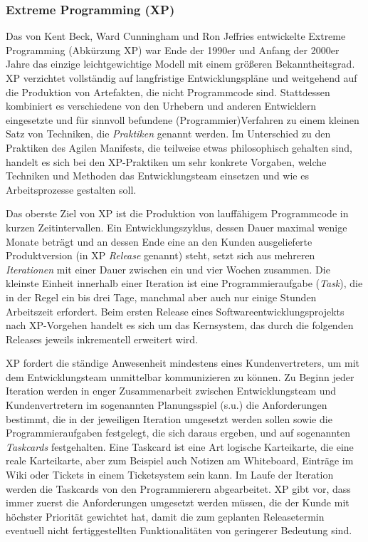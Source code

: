 \subsubsection{Extreme Programming (XP)}
\label{sec:Kap-2.2.3.1}


Das von Kent  Beck, Ward Cunningham und Ron Jeffries entwickelte Extreme Programming (Abkürzung XP) war Ende der 1990er und Anfang der 2000er Jahre das einzige leichtgewichtige Modell mit einem größeren Bekanntheitsgrad. XP verzichtet vollständig auf langfristige Entwicklungspläne und weitgehend auf die Produktion von Artefakten, die nicht Programmcode sind. Stattdessen kombiniert es verschiedene von den Urhebern und anderen Entwicklern eingesetzte und für sinnvoll befundene (Programmier)Verfahren zu einem kleinen Satz von Techniken, die 
\textit{Praktiken} genannt werden. Im Unterschied zu den Praktiken des Agilen Manifests, die teilweise etwas philosophisch gehalten sind, handelt es sich bei den XP-Praktiken um sehr konkrete Vorgaben, welche Techniken und Methoden das Entwicklungsteam einsetzen und wie es Arbeitsprozesse gestalten soll. 


Das oberste Ziel von XP ist die Produktion von lauffähigem Programmcode in kurzen Zeitintervallen. Ein Entwicklungszyklus, dessen Dauer maximal wenige Monate beträgt und an dessen Ende eine an den Kunden ausgelieferte Produktversion (in XP \textit{Release}
genannt) steht, setzt sich aus mehreren \textit{Iterationen} mit einer Dauer zwischen ein und vier Wochen zusammen. Die kleinste Einheit innerhalb einer Iteration ist eine Programmieraufgabe (\textit{Task}), die in der Regel ein bis drei Tage, manchmal aber auch nur einige Stunden Arbeitszeit erfordert. Beim ersten Release eines Softwareentwicklungsprojekts nach XP-Vorgehen handelt es sich um das Kernsystem, das durch die folgenden Releases jeweils inkrementell erweitert wird.

XP fordert die ständige Anwesenheit mindestens eines Kundenvertreters, um mit dem Entwicklungsteam unmittelbar kommunizieren zu können. Zu Beginn jeder Iteration werden in enger Zusammenarbeit zwischen Entwicklungsteam und Kundenvertretern im sogenannten Planungsspiel (s.u.) die Anforderungen bestimmt, die in der jeweiligen Iteration umgesetzt werden sollen sowie die Programmieraufgaben festgelegt, die sich daraus ergeben, und auf sogenannten \textit{Taskcards} 
festgehalten. Eine Taskcard ist eine Art logische Karteikarte, die eine reale Karteikarte, aber zum Beispiel auch Notizen am Whiteboard, Einträge im Wiki oder Tickets in einem Ticketsystem sein kann. Im Laufe der Iteration werden die Taskcards von den Programmierern abgearbeitet. XP gibt vor, dass immer zuerst die Anforderungen umgesetzt werden müssen, die der Kunde mit höchster Priorität gewichtet hat, damit die zum geplanten Releasetermin eventuell nicht fertiggestellten Funktionalitäten von geringerer Bedeutung sind. 

